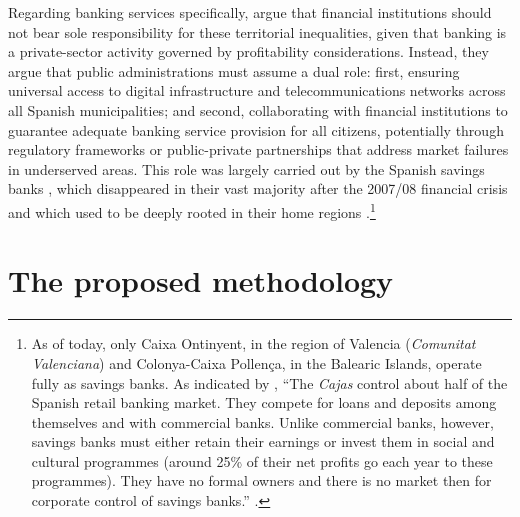 \documentclass[a4paper,11pt,oneside]{article}
\begin{document}

Regarding banking services specifically, \cite{goerlich2021distribucion} argue that financial institutions should not bear sole responsibility for these territorial inequalities, given that banking is a private-sector activity governed by profitability considerations. Instead, they argue that public administrations must assume a dual role: first, ensuring universal access to digital infrastructure and telecommunications networks across all Spanish municipalities; and second, collaborating with financial institutions to guarantee adequate banking service provision for all citizens, potentially through regulatory frameworks or public-private partnerships that address market failures in underserved areas. This role was largely carried out by the Spanish savings banks \citep[the so-called \textit{cajas},][]{bernad.fuentelsaz.gomez2008deregulation}, which disappeared in their vast majority after the 2007/08 financial crisis and which used to be deeply rooted in their home regions \citep{cunat2010did,martin2017fall}.\footnote{As of today, only Caixa Ontinyent, in the region of Valencia (\textit{Comunitat Valenciana}) and Colonya-Caixa Pollença, in the Balearic Islands, operate fully as savings banks. As indicated by \cite{crespi-garciacestona-salas-jbf}, ``The \textit{Cajas} control about half of the Spanish retail banking market. They compete for loans and deposits among themselves and with commercial banks. Unlike commercial banks, however, savings banks must either retain their earnings or invest them in social and cultural programmes (around 25\% of their net profits go each year to these programmes). They have no formal owners and there is no market then for corporate control of savings banks.'' \citep[see][p.2313]{crespi-garciacestona-salas-jbf}.}



\section{The proposed methodology}
\label{sec:methods}
\end{document}
